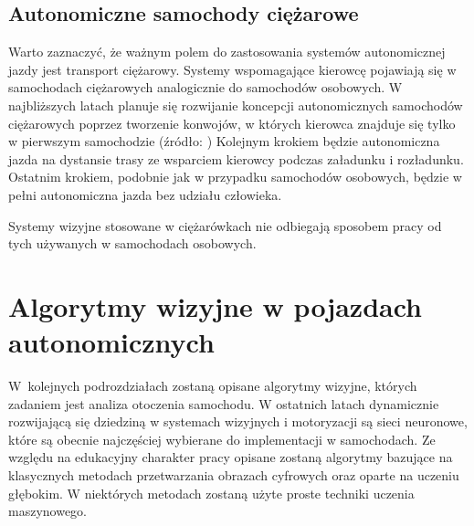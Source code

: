 \subsection{Autonomiczne samochody ciężarowe}

Warto zaznaczyć, że ważnym polem do zastosowania systemów autonomicznej jazdy jest transport ciężarowy. %
Systemy wspomagające kierowcę pojawiają się w samochodach ciężarowych analogicznie do samochodów osobowych. %
W najbliższych latach planuje się rozwijanie koncepcji autonomicznych samochodów ciężarowych poprzez tworzenie konwojów, w których kierowca znajduje się tylko w pierwszym samochodzie (źródło: \cite{W4})%
Kolejnym krokiem będzie autonomiczna jazda na dystansie trasy ze wsparciem kierowcy podczas załadunku i rozładunku. 
Ostatnim krokiem, podobnie jak w przypadku samochodów osobowych, będzie w pełni autonomiczna jazda bez udziału człowieka.

Systemy wizyjne stosowane w ciężarówkach nie odbiegają sposobem pracy od tych używanych w samochodach osobowych.





\section{Algorytmy wizyjne w pojazdach autonomicznych}
W~kolejnych podrozdziałach zostaną opisane algorytmy wizyjne, których zadaniem jest analiza otoczenia samochodu. %
W ostatnich latach dynamicznie rozwijającą się dziedziną w systemach wizyjnych i motoryzacji są sieci neuronowe, które są obecnie najczęściej wybierane do implementacji w samochodach. 
Ze względu na edukacyjny charakter pracy opisane zostaną algorytmy bazujące na klasycznych metodach przetwarzania obrazach cyfrowych oraz oparte na uczeniu głębokim. %
W niektórych metodach zostaną użyte proste techniki uczenia maszynowego.
